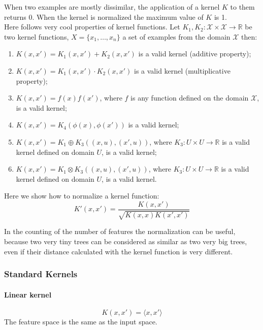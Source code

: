 When two examples are mostly dissimilar, the application of a kernel $K$ to them
returns 0. When the kernel is normalized the maximum value of $K$ is 1.\\
Here follows very cool properties of kernel functions. Let $K_1, K_2:
\mathcal{X} \times \mathcal{X} \rightarrow \mathbb{R}$  be two kernel functions,
$X = \{x_1, \dots, x_n\}$ a set of examples from the domain $\mathcal{X}$ then:
\begin{enumerate}
	\item $K(x, x') = K_1(x, x') + K_2(x, x')$ is a valid kernel (additive property);

	\item $K(x, x') = K_1(x, x') \cdot K_2(x, x')$ is a valid kernel (multiplicative property);

	\item $K(x, x') = f(x)f(x')$, where $f$ is any function defined on the
		domain $\mathcal{X}$, is a valid kernel;

	\item $K(x, x') = K_4(\phi(x), \phi(x'))$ is a valid kernel;

	\item $K(x, x') = K_1 \oplus K_3((x, u), (x', u))$,
		where $K_3: U \times U \rightarrow \mathbb{R}$ is a valid kernel defined
		on domain $U$, is a valid kernel;

	\item $K(x, x') = K_1 \otimes K_3((x, u), (x', u))$,
		where $K_3: U \times U \rightarrow \mathbb{R}$ is a valid kernel defined
		on domain $U$, is a valid kernel.
\end{enumerate}

Here we show how to normalize a kernel function:
\begin{equation}
	K'(x, x') = \frac{K(x, x')}{\sqrt{K(x, x)K(x', x')}}
\end{equation}

In the counting of the number of features the normalization can be useful,
because two very tiny trees can be considered as similar as two very big trees,
even if their distance calculated with the kernel function is very different.

\subsubsection{Standard Kernels}

\paragraph{Linear kernel}
\begin{equation}
	K(x, x') = \langle x, x' \rangle
\end{equation}
The feature space is the same as the input space.

